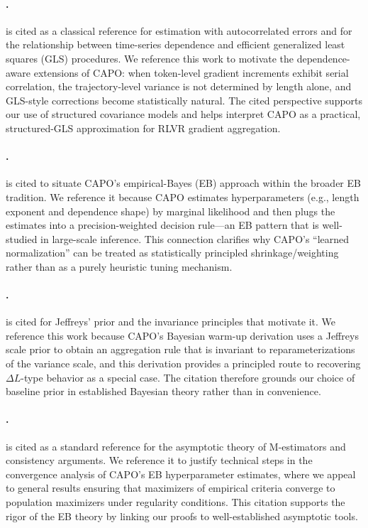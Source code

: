\paragraph{\citet{hamilton1994time}.}
\citet{hamilton1994time} is cited as a classical reference for estimation with autocorrelated errors and for the relationship between time-series dependence and efficient generalized least squares (GLS) procedures.
We reference this work to motivate the dependence-aware extensions of CAPO: when token-level gradient increments exhibit serial correlation, the trajectory-level variance is not determined by length alone, and GLS-style corrections become statistically natural.
The cited perspective supports our use of structured covariance models and helps interpret CAPO as a practical, structured-GLS approximation for RLVR gradient aggregation.

\paragraph{\citet{efron2012large}.}
\citet{efron2012large} is cited to situate CAPO's empirical-Bayes (EB) approach within the broader EB tradition.
We reference it because CAPO estimates hyperparameters (e.g., length exponent and dependence shape) by marginal likelihood and then plugs the estimates into a precision-weighted decision rule---an EB pattern that is well-studied in large-scale inference.
This connection clarifies why CAPO's ``learned normalization'' can be treated as statistically principled shrinkage/weighting rather than as a purely heuristic tuning mechanism.

\paragraph{\citet{jeffreys1946invariant}.}
\citet{jeffreys1946invariant} is cited for Jeffreys' prior and the invariance principles that motivate it.
We reference this work because CAPO's Bayesian warm-up derivation uses a Jeffreys scale prior to obtain an aggregation rule that is invariant to reparameterizations of the variance scale, and this derivation provides a principled route to recovering $\Delta L$-type behavior as a special case.
The citation therefore grounds our choice of baseline prior in established Bayesian theory rather than in convenience.

\paragraph{\citet{vandervaart1998}.}
\citet{vandervaart1998} is cited as a standard reference for the asymptotic theory of M-estimators and consistency arguments.
We reference it to justify technical steps in the convergence analysis of CAPO's EB hyperparameter estimates, where we appeal to general results ensuring that maximizers of empirical criteria converge to population maximizers under regularity conditions.
This citation supports the rigor of the EB theory by linking our proofs to well-established asymptotic tools.

